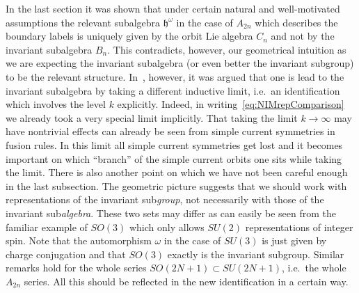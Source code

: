 \documentclass[12pt,a4paper]{article}
\newcommand{\mf}{\mathfrak} %
\def\sg{\mf{h}^\omega} %
\begin{document}
\begin{appendix}
  In the last section it was shown that under certain natural and
  well-motivated assumptions the relevant subalgebra $\sg$ in the case of
  $A_{2n}$ which describes the boundary labels is uniquely given by the
  orbit Lie algebra $C_n$ and not by the
  invariant subalgebra $B_n$. This contradicts, however, our geometrical
  intuition as we are expecting the invariant subalgebra (or even better
  the invariant subgroup) to be the relevant structure.
  In~\cite{Quella:2001wh}, however, it was argued that one is lead to
  the invariant subalgebra by taking a different inductive limit, i.e.\ an
  identification which involves the level $k$ explicitly. Indeed, in
  writing~\eqref{eq:NIMrepComparison} we already took a very special limit
  implicitly. That taking the limit $k\to\infty$ may have nontrivial effects
  can already be seen from simple current symmetries in fusion rules. In this
  limit all simple current symmetries get lost and it becomes important on
  which ``branch'' of the simple current orbits one sits while taking the
  limit. There is also another point on which we have not been careful enough
  in the last subsection. The geometric picture suggests that we should work
  with representations of the invariant sub{\em group}, not necessarily with
  those of the invariant sub{\em algebra}. These two sets may differ as can
  easily be seen from the familiar example of $SO(3)$ which only allows
  $SU(2)$ representations of integer spin. Note that the automorphism
  $\omega$ in the case of $SU(3)$ is just given by charge conjugation and
  that $SO(3)$ exactly is the invariant subgroup. Similar remarks hold
  for the whole series $SO(2N+1)\subset SU(2N+1)$, i.e.\ the whole
  $A_{2n}$ series. All this
  should be reflected in the new identification in a certain way.


\end{appendix}
\end{document}
